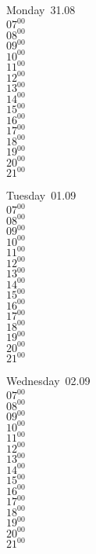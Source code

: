 \documentclass[11pt,a4paper]{book}\usepackage[]{graphicx}\usepackage[]{color}
\begin{document}
\begin{headerbox}
\end{headerbox}
\begin{weekdaybox}
  Monday~31.08\\
  { 
  \vfill
  $07^{00}$\\
$08^{00}$\\
$09^{00}$\\
$10^{00}$\\
$11^{00}$\\
$12^{00}$\\
$13^{00}$\\
$14^{00}$\\
$15^{00}$\\
$16^{00}$\\
$17^{00}$\\
$18^{00}$\\
$19^{00}$\\
$20^{00}$\\
$21^{00}$\\
  }
\end{weekdaybox}
\begin{weekdaybox}
  Tuesday~01.09\\
  { 
  \vfill
  $07^{00}$\\
$08^{00}$\\
$09^{00}$\\
$10^{00}$\\
$11^{00}$\\
$12^{00}$\\
$13^{00}$\\
$14^{00}$\\
$15^{00}$\\
$16^{00}$\\
$17^{00}$\\
$18^{00}$\\
$19^{00}$\\
$20^{00}$\\
$21^{00}$\\
  }
\end{weekdaybox}
\begin{weekdaybox}
  Wednesday~02.09\\
  { 
  \vfill
  $07^{00}$\\
$08^{00}$\\
$09^{00}$\\
$10^{00}$\\
$11^{00}$\\
$12^{00}$\\
$13^{00}$\\
$14^{00}$\\
$15^{00}$\\
$16^{00}$\\
$17^{00}$\\
$18^{00}$\\
$19^{00}$\\
$20^{00}$\\
$21^{00}$\\
  }
\end{weekdaybox}
\end{document}
